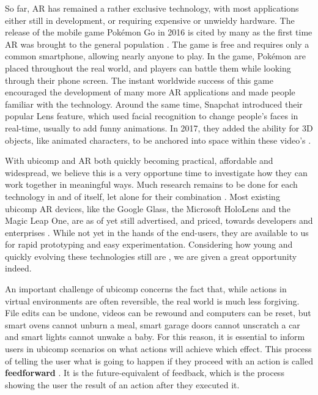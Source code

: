 So far, AR has remained a rather exclusive technology, with most applications either still in development, or requiring expensive or unwieldy hardware. The release of the mobile game Pokémon Go in 2016 is cited by many as the first time AR was brought to the general population \cite{HowPokem83:online}. The game is free and requires only a common smartphone, allowing nearly anyone to play. In the game, Pokémon are placed throughout the real world, and players can battle them while looking through their phone screen. The instant worldwide success of this game encouraged the development of many more AR applications and made people familiar with the technology. Around the same time, Snapchat introduced their popular Lens feature, which used facial recognition to change people's faces in real-time, usually to add funny animations. In 2017, they added the ability for 3D objects, like animated characters, to be anchored into space within these video's \cite{Snapchat36:online}.

With ubicomp and AR both quickly becoming practical, affordable and widespread, we believe this is a very opportune time to investigate how they can work together in meaningful ways. Much research remains to be done for each technology in and of itself, let alone for their combination \cite{liberati2016augmented}. Most existing ubicomp AR devices, like the Google Glass, the Microsoft HoloLens and the Magic Leap One, are as of yet still advertised, and priced, towards developers and enterprises \cite{Wearable31:online,Microsof18:online,MagicLea40:online}. While not yet in the hands of the end-users, they are available to us for rapid prototyping and easy experimentation. Considering how young and quickly evolving these technologies still are \cite{liberati2016augmented}, we are given a great opportunity indeed.

An important challenge of ubicomp concerns the fact that, while actions in virtual environments are often reversible, the real world is much less forgiving. File edits can be undone, videos can be rewound and computers can be reset, but smart ovens cannot unburn a meal, smart garage doors cannot unscratch a car and smart lights cannot unwake a baby. For this reason, it is essential to inform users in ubicomp scenarios on what actions will achieve which effect. This process of telling the user what is going to happen if they proceed with an action is called \textbf{feedforward} \citeauthor{djajadiningrat2002but}. It is the future-equivalent of feedback, which is the process showing the user the result of an action after they executed it.

